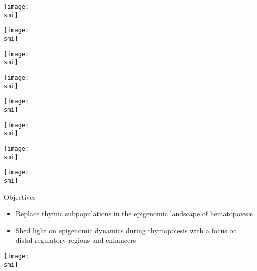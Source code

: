 \documentclass[10pt]{beamer}
\def\smi{out/ln/updir/mw-gcthesis-oral/library.bib}
\begin{document}
\begin{frame}[plain]
  \def\smi{out/ln/updir/mw-gcthesis-oral/ink/necker-collaboration.pdf}
  \texttt{[image: \\smi]}
\end{frame}
\begin{frame}[plain]
  \def\smi{out/ln/updir/mw-gcthesis-oral/ink/Ulirsch2019-fig1-recolored.pdf}
  \texttt{[image: \\smi]}
\end{frame}
\begin{frame}[plain]
  \def\smi{out/ln/updir/mw-gcthesis-oral/ink/thymus/1.pdf}
  \texttt{[image: \\smi]}
\end{frame}
\begin{frame}[plain]
  \def\smi{out/ln/updir/mw-gcthesis-oral/ink/thymus/2.pdf}
  \texttt{[image: \\smi]}
\end{frame}
\begin{frame}[plain]
  \def\smi{out/ln/updir/mw-gcthesis-oral/ink/thymus/3.pdf}
  \texttt{[image: \\smi]}
\end{frame}
\begin{frame}[plain]
  \def\smi{out/ln/updir/mw-gcthesis-oral/ink/thymus/4.pdf}
  \texttt{[image: \\smi]}
\end{frame}
\begin{frame}[plain]
  \def\smi{out/ln/updir/mw-gcthesis-oral/ink/thymus/5.pdf}
  \texttt{[image: \\smi]}
\end{frame}
\begin{frame}[plain]
  \def\smi{out/ln/updir/mw-gcthesis-oral/ink/thymus/6.pdf}
  \texttt{[image: \\smi]}
\end{frame}
\begin{frame}[plain]{Objectives}
  \begin{itemize}
    \item Replace thymic subpopulations in the epigenomic landscape of hematopoiesis
    \item Shed light on epigenomic dynamics during thymopoiesis with a focus on distal regulatory regions and enhancers
  \end{itemize}
\end{frame}
\begin{frame}[plain]
  \def\smi{out/ln/updir/mw-gcthesis-oral/ink/wgbs/matrix.pdf}
  \texttt{[image: \\smi]}%
\end{frame}
\end{document}
